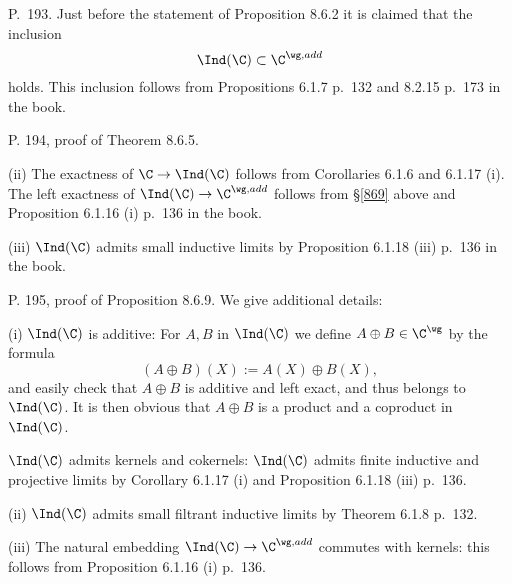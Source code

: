 \documentclass[12pt]{article}
\theoremstyle{remark}
\theoremstyle{definition}
\begin{document}
%


\begin{s}
P.~193. Just before the statement of Proposition 8.6.2 it is claimed that the inclusion 
$$
\Ind(\C)\subset\C^{\wg,add}
$$ 
holds. This inclusion follows from Propositions 6.1.7 p.~132 and 8.2.15 p.~173 in the book.
\end{s}

%

\begin{s}
P. 194, proof of Theorem 8.6.5. 

\nn(ii) The exactness of $\C\to\Ind(\C)$ follows from Corollaries 6.1.6 and 6.1.17 (i). The left exactness of $\Ind(\C)\to\C^{\wg,add}$ follows from \S\ref{869} above and Proposition 6.1.16 (i) p.~136 in the book. 

\nn(iii) $\Ind(\C)$ admits small inductive limits by Proposition 6.1.18 (iii) p.~136 in the book.
\end{s}

%

\begin{s} 
P. 195, proof of Proposition 8.6.9. We give additional details:

\nn(i) $\Ind(\C)$ is additive: For $A,B$ in $\Ind(\C)$ we define $A\oplus B\in\C^\wg$ by the formula 
$$
(A\oplus B)(X):=A(X)\oplus B(X),
$$ 
and easily check that $A\oplus B$ is additive and left exact, and thus belongs to $\Ind(\C)$. It is then obvious that $A\oplus B$ is a product and a coproduct in $\Ind(\C)$. 

$\Ind(\C)$ admits kernels and cokernels: $\Ind(\C)$ admits finite inductive and projective limits by Corollary 6.1.17 (i) and Proposition 6.1.18 (iii) p.~136.

\nn(ii) $\Ind(\C)$ admits small filtrant inductive limits by Theorem 6.1.8 p.~132.

\nn(iii) The natural embedding $\Ind(\C)\to\C^{\wg,add}$ commutes with kernels: this follows from Proposition 6.1.16 (i) p.~136.
\end{s}

%
\end{document}

